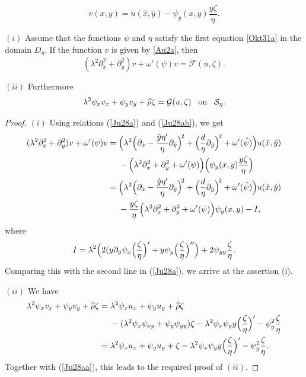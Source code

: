 \documentclass[10pt,a4paper]{amsart}
\begin{document}
\begin{equation}\label{Au2a}
v(x,y)=u(\hat{x},\hat{y})-\psi_{y}(x,y)\frac{y\zeta}{\eta}.%
\end{equation}

\begin{lemma} $(i)$ Assume that the functions $\psi$ and $\eta$ satisfy the first equation\/ \eqref{Okt31a} in the domain $D_\eta$. If the function  $v$ is given by\/ \eqref{Au2a}, then
$$
(\lambda^2\partial_x^2+\partial_y^2)v+\omega'(\psi)v=\mathcal{F}(u,\zeta).
$$

$(ii)$ Furthermore
$$
\lambda^2\psi_xv_x+\psi_yv_y+\widehat{\rho}\zeta=\mathcal{G}(u,\zeta)\quad\mbox{\!on\!}\quad \mathcal{S}_\eta.
$$

\end{lemma}

\begin{proof} $(i)$ Using relations (\ref{Ju28a}) and (\ref{Ju28ab}), we get
\begin{align*}
(\lambda^2\partial_x^2+\partial_y^2)v+\omega'(\psi)v={}&\Bigl(\lambda^2\Bigl(\partial_{\hat{x}}-\frac{\hat{y}\eta'}{\eta}\partial_{\hat{y}}\Bigr)^{\!2}
+\Bigl(\frac{d}{\eta}\partial_{\hat{y}}\Bigr)^{\!2} +\omega'(\hat{\psi})\Bigr)u(\hat{x},\hat{y})\\
&{}-\Bigl(\lambda^2\partial_x^2+\partial_y^2+\omega'(\psi)\Bigr)\Bigl(\psi_{y}(x,y)\frac{y\zeta}{\eta}\Bigr)\\
{}={}&\Bigl(\lambda^2\Bigl(\partial_{\hat{x}}-\frac{\hat{y}\eta'}{\eta}\partial_{\hat{y}}\Bigr)^{\!2}+\Bigl(\frac{d}{\eta}\partial_{\hat{y}}\Bigr)^{\!2} +\omega'(\hat{\psi})\Bigr)u(\hat{x},\hat{y})\\
&{}-\frac{y\zeta}{\eta}\Bigl(\lambda^2\partial_x^2+\partial_y^2+\omega'(\psi)\Bigr)\psi_{y}(x,y)-I,
\end{align*}
where
\begin{equation*}
I=\lambda^2\Bigl(2(y\partial_y\psi_x\Bigl(\frac{\zeta}{\eta}\Bigr)'+y\psi_y\Bigl(\frac{\zeta}{\eta}\Bigr)''\Bigr)+2\psi_{yy}\frac{\zeta}{\eta}.
\end{equation*}
 Comparing this with the second line in (\ref{Ju28a}), we arrive at the assertion (i).

$(ii)$ We have
\begin{align*}
\lambda^2\psi_xv_x+\psi_yv_y+\widehat{\rho}\zeta={}&\lambda^2\psi_xu_x+\psi_yu_y+\widehat{\rho}\zeta\\
&{}-(\lambda^2\psi_x\psi_{xy}+\psi_y\psi_{yy})\zeta-\lambda^2\psi_x\psi_y y\Bigl(\frac{\zeta}{\eta}\Bigr)'-\psi_y^2\frac{\zeta}{\eta}\\
{}={}&\lambda^2\psi_xu_x+\psi_yu_y+\zeta-\lambda^2\psi_x\psi_y y\Bigl(\frac{\zeta}{\eta}\Bigr)'-\psi_y^2\frac{\zeta}{\eta}.
\end{align*}
Together with (\ref{Ju28aa}), this leads to the required proof of $(ii)$.
\end{proof}
\end{document}
